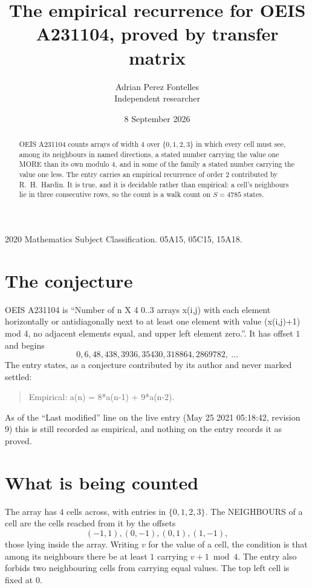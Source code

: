 \documentclass[11pt,a4paper]{article}
\title{The empirical recurrence for OEIS A231104, proved by transfer matrix}
\author{Adrian Perez Fontelles\\ \small Independent researcher}
\date{8 September 2026}
\theoremstyle{plain}
\theoremstyle{definition}
\begin{document}
\maketitle

\begin{abstract}
OEIS A231104 counts arrays of width $4$ over $\{0,1,2,3\}$ in which every cell must see, among its
neighbours in named directions, a stated number carrying the value one MORE than its own
modulo $4$, and in some of the family a stated number carrying the value one less. The entry
carries an empirical recurrence of order $2$ contributed by R.~H.~Hardin. It is true, and
it is decidable rather than empirical: a cell's neighbours lie in three consecutive rows, so
the count is a walk count on $S=4785$ states.
\end{abstract}

\noindent\small 2020 Mathematics Subject Classification. 05A15, 05C15, 15A18.\normalsize

\section{The conjecture}

OEIS A231104 is ``Number of n X 4 0..3 arrays x(i,j) with each element horizontally or antidiagonally next to at least one element with value (x(i,j)+1) mod 4, no adjacent elements equal, and upper left element zero.''. It has offset $1$ and begins
\[
0, 6, 48, 438, 3936, 35430, 318864, 2869782,\ \dots
\]
The entry states, as a conjecture contributed by its author and never marked settled:
\begin{quote}
Empirical: a(n) = 8*a(n-1) + 9*a(n-2).
\end{quote}
As of the ``Last modified'' line on the live entry (May 25 2021 05:18:42, revision 9) this is still
recorded as empirical, and nothing on the entry records it as proved.

\section{What is being counted}

The array has $4$ cells across, with entries in $\{0,1,2,3\}$. The NEIGHBOURS of a cell are the
cells reached from it by the offsets
\[
(-1,1), (0,-1), (0,1), (1,-1),
\]
those lying inside the array. Writing $v$ for the value of a cell, the condition is that among
its neighbours there be at least $1$ carrying $v+1 \bmod 4$. The entry also forbids two neighbouring cells from carrying equal values. The top left
cell is fixed at $0$.
\end{document}
